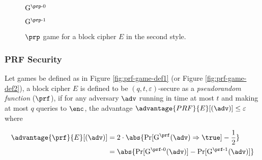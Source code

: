 \begin{figure}[h]
    \centering
    \begin{codeframe}[colback = white, width=4.5cm, height=4.5cm]{$\mathrm{G}^{\prp\textrm-0}$}
        \begin{pcvstack}[space=0.3cm]
    
        \end{pcvstack}
    \end{codeframe}
    \hspace{0.5cm}
    \begin{codeframe}[colback = white, width=4.5cm, height=4.5cm]{$\mathrm{G}^{\prp\textrm-1}$}
        \begin{pcvstack}[space=0.3cm]

        \end{pcvstack}
    \end{codeframe}
\caption{$\prp$ game for a block cipher $E$ in the second style.}
\label{fig:prp-game-def2}
\end{figure}



\subsubsection{PRF Security}
Let games be defined as in Figure \ref{fig:prf-game-def1} (or Figure \ref{fig:prf-game-def2}), a block cipher $E$ is defined to be $(q,t,\varepsilon)$-secure as a \textit{pseudorandom function} ($\prf$), if for any adversary $\adv$ running in time at most $t$ and making at most $q$ queries to $\enc$, the advantage $\advantage{PRF}{E}[(\adv)] \leq \varepsilon$ where

$$
\begin{aligned}
\advantage{\prf}{E}[(\adv)] &= 2 \cdot \abs{\Pr[\mathrm{G}^\prf (\adv) \Rightarrow \true ] - \frac{1}{2}} \\
&= \abs{\Pr[\mathrm{G}^{\prf\textrm-0}(\adv)] - \Pr[\mathrm{G}^{\prf\textrm-1}(\adv)]}
\end{aligned}
$$ 


